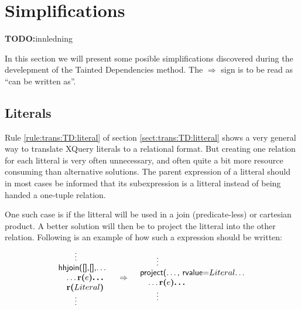 \section{Simplifications}
\label{sect:trans:TD:simplifications}

\textbf{\LARGE TODO:}innledning

In this section we will present some posible simplifications discovered during the develepment of the Tainted
Dependencies method. The $\Rightarrow$ sign is to be read as ``can be written as''. 

\subsection{Literals}
\label{sect:trans:TD:simpl:lit}      

Rule \ref{rule:trans:TD:literal} of section \ref{sect:trans:TD:litteral} shows a very general way to translate
XQuery literals to a relational format. But creating one relation for each litteral is very often unnecessary, and
often quite a bit more resource consuming than alternative solutions. The parent expression of a litteral should
in most cases be informed that its subexpression is a litteral instead of being handed a one-tuple relation.

One such case is if the litteral will be used in a join (predicate-less) or cartesian product. A better solution
will then be to project the litteral into the other relation. Following is an example of how such a expression
should be written:
\begin{equation}
\begin{array}{lcr}
\begin{array}{l}
\mbox{\quad\quad\textsf{\vdots}} \\
\mbox{\textsf{hhjoin([],[],\ldots}} \\ \quad
\mbox{\textsf{\ldots}\textbf{r(}}e\mbox{\textbf{)\ldots}} \\ \quad
\mbox{\textbf{r(}}Literal\mbox{\textbf{)}} \\
\mbox{\quad\quad\textsf{\vdots}}
\end{array}
&
\Rightarrow
&
\begin{array}{l}
\mbox{\quad\quad\textsf{\vdots}} \\
\mbox{\textsf{project(\ldots, rvalue=}}Literal\mbox{\textsf{\ldots}} \\ \quad
\mbox{\textsf{\ldots}\textbf{r(}}e\mbox{\textbf{)\ldots}} \\
\mbox{\quad\quad\textsf{\vdots}}
\end{array}
\end{array}
\label{simpl:trans:TD:joinLit}
\end{equation}

